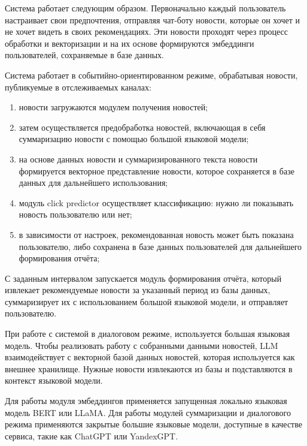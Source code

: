 Система работает следующим образом. Первоначально каждый пользователь настраивает свои предпочтения, отправляя чат-боту новости, которые он хочет и не хочет видеть в своих рекомендациях. Эти новости проходят через процесс обработки и векторизации и на их основе формируются эмбеддинги пользователей, сохраняемые в базе данных.

Система работает в событийно-ориентированном режиме, обрабатывая новости, публикуемые в отслеживаемых каналах:
\begin{enumerate}
    \item новости загружаются модулем получения новостей;
    \item затем осуществляется предобработка новостей, включающая в себя суммаризацию новости с помощью большой языковой модели;
    \item на основе данных новости и суммаризированного текста новости формируется векторное представление новости, которое сохраняется в базе данных для дальнейшего использования;
    \item модуль click predictor осуществляет классификацию: нужно ли показывать новость пользователю или нет;
    \item в зависимости от настроек, рекомендованная новость может быть показана пользователю, либо сохранена в базе данных пользователей для дальнейшего формирования отчёта;
\end{enumerate}

С заданным интервалом запускается модуль формирования отчёта, который извлекает рекомендуемые новости за указанный период из базы данных, суммаризирует их с использованием большой языковой модели, и отправляет пользователю.

При работе с системой в диалоговом режиме, используется большая языковая модель. Чтобы реализовать работу с собранными данными новостей, LLM взаимодействует с векторной базой данных новостей, которая используется как внешнее хранилище. Нужные новости извлекаются из базы и подставляются в контекст языковой модели.

Для работы модуля эмбеддингов применяется запущенная локально языковая модель BERT или LLaMA. Для работы модулей суммаризации и диалогового режима применяются закрытые большие языковые модели, доступные в качестве сервиса, такие как ChatGPT или YandexGPT.

